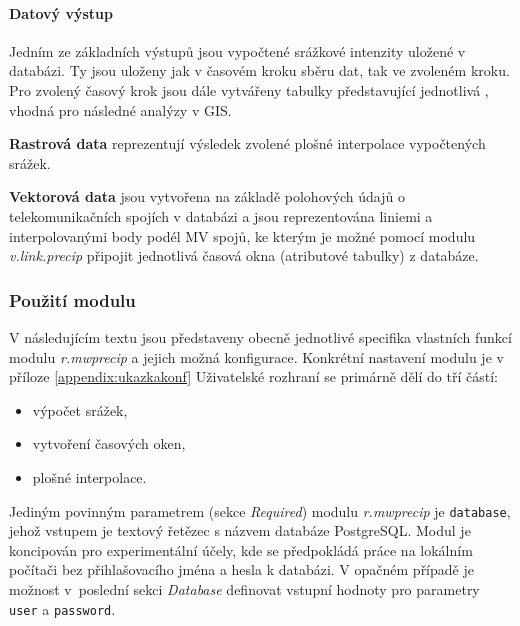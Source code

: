 \documentclass[a4paper,12pt,oneside]{report}
\begin{document}
\paragraph*{Datový výstup}
Jedním ze základních výstupů jsou vypočtené srážkové intenzity uložené
v databázi. Ty jsou uloženy jak v časovém kroku sběru dat, tak ve
zvoleném kroku. Pro zvolený časový krok jsou dále vytvářeny tabulky
představující jednotlivá , vhodná pro následné
analýzy v GIS.

\textbf{Rastrová data} reprezentují výsledek zvolené plošné
interpolace vypočtených srážek.

\textbf{Vektorová data} jsou vytvořena na základě polohových údajů o
telekomunikačních spojích v databázi a jsou reprezentována liniemi a
interpolovanými body podél MV spojů, ke kterým je možné pomocí modulu
\textit{v.link.precip} připojit jednotlivá časová okna (atributové tabulky) z databáze.
 
\subsubsection*{Použití modulu}
V následujícím textu jsou představeny obecně jednotlivé specifika vlastních funkcí modulu
\textit{r.mwprecip} a jejich možná konfigurace. Konkrétní nastavení modulu je v příloze \ref{appendix:ukazkakonf}
Uživatelské rozhraní se primárně dělí do tří částí:

\begin{itemize}
\item výpočet srážek,
\item vytvoření časových oken,
\item plošné interpolace.
\end{itemize}

Jediným povinným parametrem (sekce \textit{Required}) modulu
\textit{r.mwprecip} je \texttt{database}, jehož vstupem je textový
řetězec s názvem databáze PostgreSQL. Modul je koncipován pro
experimentální účely, kde se předpokládá práce na lokálním počítači
bez přihlašovacího jména a hesla k databázi. V opačném případě je
možnost v~poslední sekci \textit{Database} definovat vstupní hodnoty
pro parametry \texttt{user} a \texttt{password}.
\end{document}
